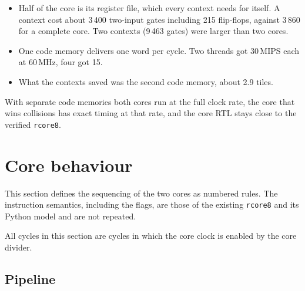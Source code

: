 \documentclass[10pt,a4paper]{article}
\begin{document}
\begin{itemize}
\item Half of the core is its register file, which every context needs for itself. A context cost about 3\,400
two-input gates including 215 flip-flops, against 3\,860 for a complete core. Two contexts (9\,463 gates) were
larger than two cores.
\item One code memory delivers one word per cycle. Two threads got 30\,MIPS each at 60\,MHz, four got 15.
\item What the contexts saved was the second code memory, about 2.9 tiles.
\end{itemize}

With separate code memories both cores run at the full clock rate, the core that wins collisions has exact
timing at that rate, and the core RTL stays close to the verified \texttt{rcore8}.

\section{Core behaviour}\label{sec:corebeh}

This section defines the sequencing of the two cores as numbered rules. The instruction semantics, including
the flags, are those of the existing \texttt{rcore8} and its Python model and are not repeated.

All cycles in this section are cycles in which the core clock is enabled by the core divider.

\subsection{Pipeline}
\end{document}

